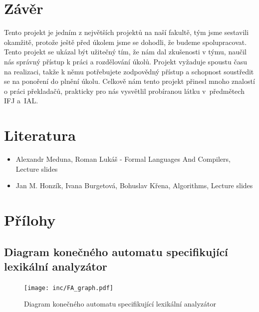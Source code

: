 \documentclass[a4paper, 11pt]{article}
\begin{document}
	\section{Závěr}

     Tento projekt je jedním z největších projektů na naší fakultě, tým jsme sestavili okamžitě, protože ještě před úkolem jsme se dohodli, že budeme spolupracovat. Tento projekt se ukázal být užitečný tím, že nám dal zkušenosti v týmu, naučil nás správný přístup k práci a rozdělování úkolů. Projekt vyžaduje spoustu času na realizaci, takže k němu potřebujete zodpovědný přístup a schopnost soustředit se na ponoření do plnění úkolu.
    Celkově nám tento projekt přinesl mnoho znalostí o práci překladačů, prakticky pro nás
    vysvětlil probíranou látku v~předmětech IFJ a~IAL.

    \section{Literatura}

    \begin{itemize}
        \item Alexandr Meduna, Roman Lukáš - Formal Languages And Compilers, Lecture slides
        \item Jan M. Honzík, Ivana Burgetová, Bohuslav Křena, Algorithms, Lecture slides
    \end{itemize}
 



	\clearpage
	
	\renewcommand{\refname}{Literatura}
	



        \section{Přílohy}
	\clearpage
	\appendix


	\subsection{Diagram konečného automatu specifikující lexikální analyzátor}
	\begin{figure}[!ht]
		\centering
		\vspace{-1.2cm}
		\texttt{[image: inc/FA\_graph.pdf]}
		\caption{Diagram konečného automatu specifikující lexikální analyzátor}
		\label{figure:fa_graph}
	\end{figure}
\end{document}
